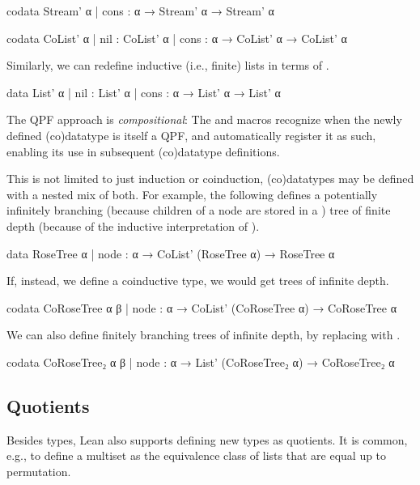 \begin{leancode}
  codata Stream' α
    | cons : α → Stream' α → Stream' α 

  codata CoList' α 
    | nil  : CoList' α
    | cons : α → CoList' α → CoList' α
\end{leancode}

Similarly, we can redefine inductive (i.e., finite) lists in terms of \data{}.

\begin{leancode}
  data List' α 
    | nil  : List' α
    | cons : α → List' α → List' α
\end{leancode}


The QPF approach is \emph{compositional}:
The \data{} and \codata{} macros recognize when the newly defined (co)datatype is itself a QPF, and automatically register it as such, enabling its use in subsequent (co)datatype definitions.



This is not limited to just induction or coinduction, (co)datatypes may be defined with a nested mix of both.
For example, the following defines a potentially infinitely branching (because children of a node are stored in a ) tree of finite depth (because of the inductive interpretation of \data{}).

\begin{leancode}
  data RoseTree α
    | node : α → CoList' (RoseTree α) → RoseTree α
\end{leancode}

If, instead, we define a coinductive type, we would get trees of infinite depth.
\begin{leancode}
  codata CoRoseTree α β
    | node : α → CoList' (CoRoseTree α) → CoRoseTree α
\end{leancode}

We can also define finitely branching trees of infinite depth, by replacing  with .
\begin{leancode}
  codata CoRoseTree₂ α β
    | node : α → List' (CoRoseTree₂ α) → CoRoseTree₂ α
\end{leancode}


\subsection*{Quotients}
Besides \inductive{} types, Lean also supports defining new types as quotients.
It is common, e.g., to define a multiset as the equivalence class of lists that are equal up to permutation.

